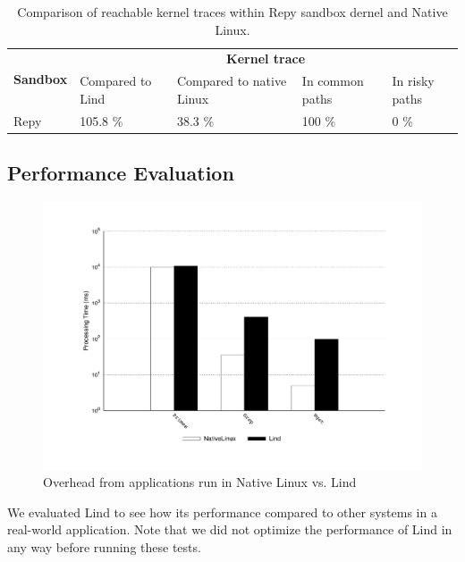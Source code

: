 {{{\begin{table}
\centering
\scriptsize
\caption{\small Comparison of reachable kernel traces within Repy sandbox dernel and Native Linux.}
\begin{tabular}{|l|l|l|l|l|}
  \hline
  \multirow{3}{.8cm}{\bf Sandbox} & \multicolumn{4}{c|}{\bf Kernel trace} \\ \cline{2-5}
  & \multirow{2}{1cm}{Compared to Lind} &
  \multirow{2}{1.3cm}{Compared to native Linux} & \multirow{2}{1.5cm}{In common paths} &
  \multirow{2}{1.0cm}{In risky paths} \\
  & & & & \\  \hline

  Repy & 105.8 \% & 38.3 \% & 100 \%  & 0 \%  \\
  \hline
\end{tabular}
\label{table:trace-Repy}
\end{table}


\subsection{Performance Evaluation}
\label{Performance-Evaluation}

\begin{figure}
\centering
\includegraphics[width=1.0\columnwidth]{diagram/lind_oakland16_performance.pdf}
\caption{\small Overhead from applications run in Native Linux vs. Lind}
\label{fig:performance_applications}
\end{figure}

We evaluated Lind to see
how its performance compared to other systems in a real-world application.
Note that we did not optimize the performance of Lind in any way before running
these tests.

}}}
